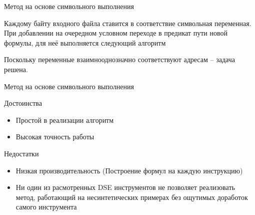 \documentclass[10pt]{beamer}
\begin{document}
\begin{frame}{Метод на основе символьного выполнения}

Каждому байту входного файла ставится в соответствие символьная переменная.
При добавлении на очередном условном переходе в предикат пути новой формулы, для неё выполняется следующий алгоритм

\begin{algorithm}[H]
\SetAlgoLined
{}
  \caption{Метод на основе символьного выполнения}
\end{algorithm}
Поскольку переменные взаимнооднозначно соответствуют адресам -- задача решена.
\end{frame}


\begin{frame}{Метод на основе символьного выполнения}

\begin{block}{Достоинства}
  \begin{itemize}
    \item Простой в реализации алгоритм
    \item Высокая точность работы
  \end{itemize}
\end{block}
\pause
\begin{block}{Недостатки}
  \begin{itemize}
    \item Низкая производительность (Построение формул на каждую инструкцию)
    \item Ни один из расмотренных DSE инструментов не позволяет реализовать метод, работающий на несинтетических примерах без ощутимых доработок самого инструмента
  \end{itemize}
\end{block}

\end{frame}
\end{document}
